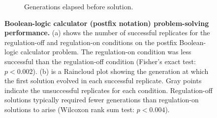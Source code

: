 \begin{figure}[ht]
\begin{subfigure}[b]{0.45\textwidth}
    \caption{\small Generations elapsed before solution.}
    \label{chapter:tag-based-regulation:subfig:boolean-calc-postfix-solve-time}
\end{subfigure}

\caption{\small 
\textbf{Boolean-logic calculator (postfix notation)  problem-solving performance.}
(a) shows the number of successful replicates for the regulation-off and regulation-on conditions on the postfix Boolean-logic calculator problem. 
The regulation-on condition was less successful than the regulation-off condition (Fisher's exact test: $p<0.002$).
(b) is a Raincloud plot showing the generation at which the first solution evolved in each successful replicate.
Gray points indicate the unsuccessful replicates for each condition.
Regulation-off solutions typically required fewer generations than regulation-on solutions to arise (Wilcoxon rank sum test: $p<0.004$).
}
\label{chapter:tag-based-regulation:fig:boolean-calc-postfix-performance}
\end{figure}
